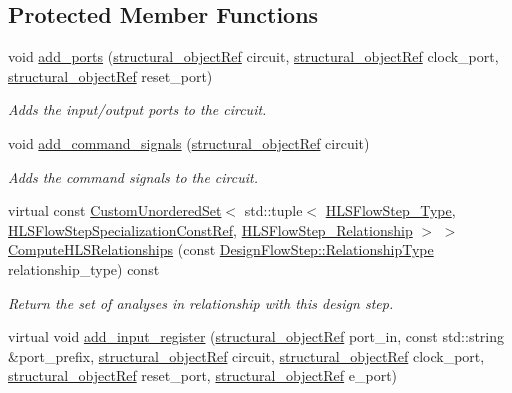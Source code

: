 \subsection*{Protected Member Functions}
\begin{DoxyCompactItemize}
\item 
void \hyperlink{classtop__entity_ad63b0b997f3905f591e00e26d07f5b86}{add\+\_\+ports} (\hyperlink{structural__objects_8hpp_a8ea5f8cc50ab8f4c31e2751074ff60b2}{structural\+\_\+object\+Ref} circuit, \hyperlink{structural__objects_8hpp_a8ea5f8cc50ab8f4c31e2751074ff60b2}{structural\+\_\+object\+Ref} clock\+\_\+port, \hyperlink{structural__objects_8hpp_a8ea5f8cc50ab8f4c31e2751074ff60b2}{structural\+\_\+object\+Ref} reset\+\_\+port)
\begin{DoxyCompactList}\small\item\em Adds the input/output ports to the circuit. \end{DoxyCompactList}\item 
void \hyperlink{classtop__entity_afe2e448da9ea30c2b071b1c477cb5c9a}{add\+\_\+command\+\_\+signals} (\hyperlink{structural__objects_8hpp_a8ea5f8cc50ab8f4c31e2751074ff60b2}{structural\+\_\+object\+Ref} circuit)
\begin{DoxyCompactList}\small\item\em Adds the command signals to the circuit. \end{DoxyCompactList}\item 
virtual const \hyperlink{classCustomUnorderedSet}{Custom\+Unordered\+Set}$<$ std\+::tuple$<$ \hyperlink{hls__step_8hpp_ada16bc22905016180e26fc7e39537f8d}{H\+L\+S\+Flow\+Step\+\_\+\+Type}, \hyperlink{hls__step_8hpp_a5fdd2edf290c196531d21d68e13f0e74}{H\+L\+S\+Flow\+Step\+Specialization\+Const\+Ref}, \hyperlink{hls__step_8hpp_a3ad360b9b11e6bf0683d5562a0ceb169}{H\+L\+S\+Flow\+Step\+\_\+\+Relationship} $>$ $>$ \hyperlink{classtop__entity_a414a49e2195ed1b077e625a546f64427}{Compute\+H\+L\+S\+Relationships} (const \hyperlink{classDesignFlowStep_a723a3baf19ff2ceb77bc13e099d0b1b7}{Design\+Flow\+Step\+::\+Relationship\+Type} relationship\+\_\+type) const
\begin{DoxyCompactList}\small\item\em Return the set of analyses in relationship with this design step. \end{DoxyCompactList}\item 
virtual void \hyperlink{classtop__entity_ad1949a318419093124c6a05b5823d0b2}{add\+\_\+input\+\_\+register} (\hyperlink{structural__objects_8hpp_a8ea5f8cc50ab8f4c31e2751074ff60b2}{structural\+\_\+object\+Ref} port\+\_\+in, const std\+::string \&port\+\_\+prefix, \hyperlink{structural__objects_8hpp_a8ea5f8cc50ab8f4c31e2751074ff60b2}{structural\+\_\+object\+Ref} circuit, \hyperlink{structural__objects_8hpp_a8ea5f8cc50ab8f4c31e2751074ff60b2}{structural\+\_\+object\+Ref} clock\+\_\+port, \hyperlink{structural__objects_8hpp_a8ea5f8cc50ab8f4c31e2751074ff60b2}{structural\+\_\+object\+Ref} reset\+\_\+port, \hyperlink{structural__objects_8hpp_a8ea5f8cc50ab8f4c31e2751074ff60b2}{structural\+\_\+object\+Ref} e\+\_\+port)

\end{DoxyCompactItemize}

